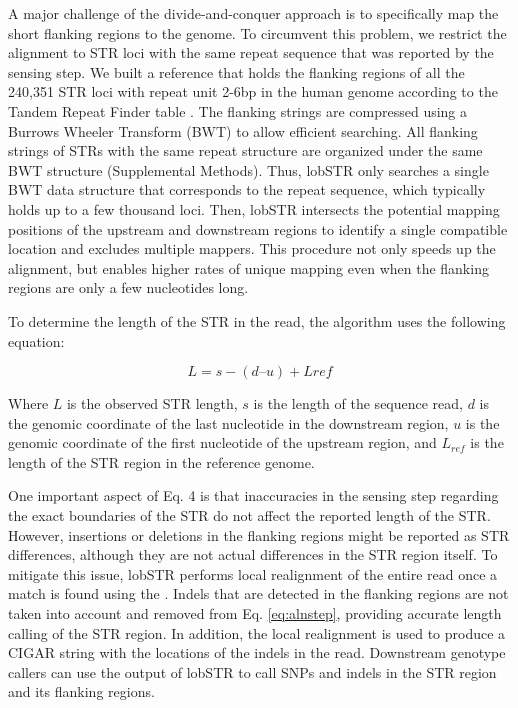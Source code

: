 A major challenge of the divide-and-conquer approach is to specifically map the short flanking regions to the genome. To circumvent this problem, we restrict the alignment to STR loci with the same repeat sequence that was reported by the sensing step. We built a reference that holds the flanking regions of all the 240,351 STR loci with repeat unit 2-6bp in the human genome according to the Tandem Repeat Finder table \cite{Benson1999}. The flanking strings are compressed using a Burrows Wheeler Transform \cite{BurrowsWheeler1994} (BWT) to allow efficient searching. All flanking strings of STRs with the same repeat structure are organized under the same BWT structure (Supplemental Methods). Thus, lobSTR only searches a single BWT data structure that corresponds to the repeat sequence, which typically holds up to a few thousand loci. Then, lobSTR intersects the potential mapping positions of the upstream and downstream regions to identify a single compatible location and excludes multiple mappers. This procedure not only speeds up the alignment, but enables higher rates of unique mapping even when the flanking regions are only a few nucleotides long. 

To determine the length of the STR in the read, the algorithm uses the following equation: 

\begin{equation} \label{eq:alnstep}
L = s - (d –u ) + L{ref}                                                                  
\end{equation}

Where $L$ is the observed STR length, $s$ is the length of the sequence read, $d$ is the genomic coordinate of the last nucleotide in the downstream region, $u$ is the genomic coordinate of the first nucleotide of the upstream region, and $L_{ref}$ is the length of the STR region in the reference genome. 

One important aspect of Eq. 4 is that inaccuracies in the sensing step regarding the exact boundaries of the STR do not affect the reported length of the STR. However, insertions or deletions in the flanking regions might be reported as STR differences, although they are not actual differences in the STR region itself. To mitigate this issue, lobSTR performs local realignment of the entire read once a match is found using the \cite{NeedlemanWunsch1970}. Indels that are detected in the flanking regions are not taken into account and removed from Eq. \ref{eq:alnstep}, providing accurate length calling of the STR region. In addition, the local realignment is used to produce a CIGAR string with the locations of the indels in the read. Downstream genotype callers can use the output of lobSTR to call SNPs and indels in the STR region and its flanking regions. 

